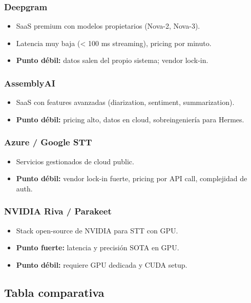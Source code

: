 \documentclass[11pt,a4paper]{article}
\begin{document}
\subsubsection{Deepgram}
\begin{itemize}[leftmargin=*,itemsep=0pt]
\item SaaS premium con modelos propietarios (Nova-2, Nova-3).
\item Latencia muy baja (< 100 ms streaming), pricing por minuto.
\item \textbf{Punto débil:} datos salen del propio sistema; vendor lock-in.
\end{itemize}

\subsubsection{AssemblyAI}
\begin{itemize}[leftmargin=*,itemsep=0pt]
\item SaaS con features avanzadas (diarization, sentiment, summarization).
\item \textbf{Punto débil:} pricing alto, datos en cloud, sobreingeniería para Hermes.
\end{itemize}

\subsubsection{Azure / Google STT}
\begin{itemize}[leftmargin=*,itemsep=0pt]
\item Servicios gestionados de cloud public.
\item \textbf{Punto débil:} vendor lock-in fuerte, pricing por API call, complejidad de auth.
\end{itemize}

\subsubsection{NVIDIA Riva / Parakeet}
\begin{itemize}[leftmargin=*,itemsep=0pt]
\item Stack open-source de NVIDIA para STT con GPU.
\item \textbf{Punto fuerte:} latencia y precisión SOTA en GPU.
\item \textbf{Punto débil:} requiere GPU dedicada y CUDA setup.
\end{itemize}

\subsection{Tabla comparativa}
\end{document}
